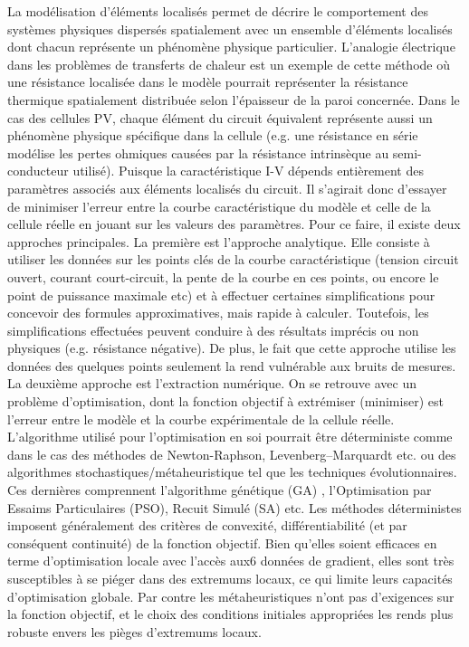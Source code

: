 La modélisation d'éléments localisés permet de décrire le comportement des systèmes physiques dispersés spatialement avec un ensemble d'éléments localisés dont chacun représente un phénomène physique particulier. L'analogie électrique dans les problèmes de transferts de chaleur est un exemple de cette méthode où une résistance localisée dans le modèle pourrait représenter la résistance thermique spatialement distribuée selon l'épaisseur de la paroi concernée. Dans le cas des cellules PV, chaque élément du circuit équivalent représente aussi un phénomène physique spécifique dans la cellule (e.g. une résistance en série modélise les pertes ohmiques causées par la résistance intrinsèque au semi-conducteur utilisé). Puisque la caractéristique I-V dépends entièrement des paramètres associés aux éléments localisés du circuit. Il s'agirait donc d'essayer de minimiser l'erreur entre la courbe caractéristique du modèle et celle de la cellule réelle en jouant sur les valeurs des paramètres. 
Pour ce faire, il existe deux approches principales. La première est l'approche analytique. Elle consiste à utiliser les données sur les points clés de la courbe caractéristique (tension circuit ouvert, courant court-circuit, la pente de la courbe en ces points, ou encore le point de puissance maximale etc) et à effectuer certaines simplifications pour concevoir des formules approximatives, mais rapide à calculer. Toutefois, les simplifications effectuées peuvent conduire à des résultats imprécis ou non physiques (e.g. résistance négative). De plus, le fait que cette approche utilise les données des quelques points seulement la rend vulnérable aux bruits de mesures. La deuxième approche est l'extraction numérique. On se retrouve avec un problème d'optimisation, dont la fonction objectif à extrémiser (minimiser) est l'erreur entre le modèle et la courbe expérimentale de la cellule réelle. L'algorithme utilisé pour l'optimisation en soi pourrait être déterministe comme dans le cas des méthodes de Newton-Raphson, Levenberg–Marquardt etc. ou des algorithmes stochastiques/métaheuristique tel que les techniques évolutionnaires. Ces dernières comprennent l'algorithme génétique (GA) , l'Optimisation par Essaims Particulaires (PSO), Recuit Simulé (SA)  etc. Les méthodes déterministes imposent généralement des critères de convexité, différentiabilité (et par conséquent continuité) de la fonction objectif. Bien qu'elles soient efficaces en terme d'optimisation locale avec l'accès aux6 données de gradient, elles sont très susceptibles à se piéger dans des extremums locaux, ce qui limite leurs capacités d'optimisation globale. Par contre les métaheuristiques n'ont pas d'exigences sur la fonction objectif, et le choix des conditions initiales appropriées les rends plus robuste envers les pièges d'extremums locaux.

